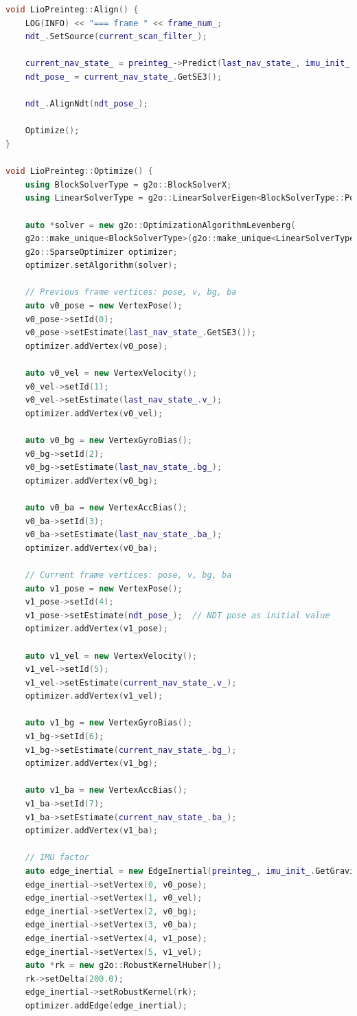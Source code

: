 \begin{lstlisting}[language=c++,caption=src/ch8/lio-preinteg/lio_preinteg.cc]
void LioPreinteg::Align() {
	LOG(INFO) << "=== frame " << frame_num_;
	ndt_.SetSource(current_scan_filter_);
	
	current_nav_state_ = preinteg_->Predict(last_nav_state_, imu_init_.GetGravity());
	ndt_pose_ = current_nav_state_.GetSE3();
	
	ndt_.AlignNdt(ndt_pose_);
	
	Optimize();
}

void LioPreinteg::Optimize() {
	using BlockSolverType = g2o::BlockSolverX;
	using LinearSolverType = g2o::LinearSolverEigen<BlockSolverType::PoseMatrixType>;
	
	auto *solver = new g2o::OptimizationAlgorithmLevenberg(
	g2o::make_unique<BlockSolverType>(g2o::make_unique<LinearSolverType>()));
	g2o::SparseOptimizer optimizer;
	optimizer.setAlgorithm(solver);
	
	// Previous frame vertices: pose, v, bg, ba
	auto v0_pose = new VertexPose();
	v0_pose->setId(0);
	v0_pose->setEstimate(last_nav_state_.GetSE3());
	optimizer.addVertex(v0_pose);
	
	auto v0_vel = new VertexVelocity();
	v0_vel->setId(1);
	v0_vel->setEstimate(last_nav_state_.v_);
	optimizer.addVertex(v0_vel);
	
	auto v0_bg = new VertexGyroBias();
	v0_bg->setId(2);
	v0_bg->setEstimate(last_nav_state_.bg_);
	optimizer.addVertex(v0_bg);
	
	auto v0_ba = new VertexAccBias();
	v0_ba->setId(3);
	v0_ba->setEstimate(last_nav_state_.ba_);
	optimizer.addVertex(v0_ba);
	
	// Current frame vertices: pose, v, bg, ba
	auto v1_pose = new VertexPose();
	v1_pose->setId(4);
	v1_pose->setEstimate(ndt_pose_);  // NDT pose as initial value
	optimizer.addVertex(v1_pose);
	
	auto v1_vel = new VertexVelocity();
	v1_vel->setId(5);
	v1_vel->setEstimate(current_nav_state_.v_);
	optimizer.addVertex(v1_vel);
	
	auto v1_bg = new VertexGyroBias();
	v1_bg->setId(6);
	v1_bg->setEstimate(current_nav_state_.bg_);
	optimizer.addVertex(v1_bg);
	
	auto v1_ba = new VertexAccBias();
	v1_ba->setId(7);
	v1_ba->setEstimate(current_nav_state_.ba_);
	optimizer.addVertex(v1_ba);
	
	// IMU factor
	auto edge_inertial = new EdgeInertial(preinteg_, imu_init_.GetGravity());
	edge_inertial->setVertex(0, v0_pose);
	edge_inertial->setVertex(1, v0_vel);
	edge_inertial->setVertex(2, v0_bg);
	edge_inertial->setVertex(3, v0_ba);
	edge_inertial->setVertex(4, v1_pose);
	edge_inertial->setVertex(5, v1_vel);
	auto *rk = new g2o::RobustKernelHuber();
	rk->setDelta(200.0);
	edge_inertial->setRobustKernel(rk);
	optimizer.addEdge(edge_inertial);
	

\end{lstlisting}
